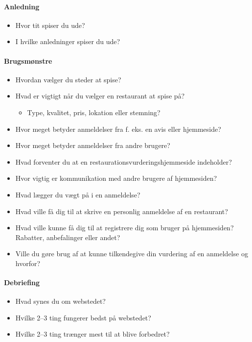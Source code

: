\documentclass[a4paper, 12pt]{article}
\begin{document}
\paragraph{Anledning}
\begin{itemize}
\item Hvor tit spiser du ude?
\item I hvilke anledninger spiser du ude?
\end{itemize}

\paragraph{Brugsmønstre}
\begin{itemize}
\item Hvordan vælger du steder at spise?
\item Hvad er vigtigt når du vælger en restaurant at spise på?
  \begin{itemize}
  \item Type, kvalitet, pris, lokation eller stemning?
  \end{itemize}
\item Hvor meget betyder anmeldelser fra f. eks. en avis eller hjemmeside?
\item Hvor meget betyder anmeldelser fra andre brugere?
\item Hvad forventer du at en restaurationsvurderingshjemmeside indeholder?
\item Hvor vigtig er kommunikation med andre brugere af hjemmesiden?
\item Hvad lægger du vægt på i en anmeldelse?
\item Hvad ville få dig til at skrive en personlig anmeldelse af en restaurant?
\item Hvad ville kunne få dig til at registrere dig som bruger på hjemmesiden?
Rabatter, anbefalinger eller andet?
\item Ville du gøre brug af at kunne tilkendegive din vurdering af en anmeldelse
og hvorfor?
\end{itemize}

\paragraph{Debriefing}
\begin{itemize}
\item Hvad synes du om webstedet?
\item Hvilke 2--3 ting fungerer bedst på webstedet?
\item Hvilke 2--3 ting trænger mest til at blive forbedret?
\end{itemize}

\printbibliography[heading=bibnumbered,title=Litteraturliste]
\end{document}
